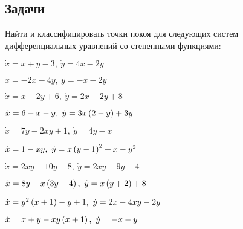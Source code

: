 \subsection{Задачи}

	Найти и классифицировать точки покоя для следующих систем дифференциальных уравнений со степенными функциями:
	\begin{multicols}{2}
		\begin{enumtasks}
			
			\label{stability_points:types_poly1}
			\item \( \dot{x} = x + y - 3, ~ \dot{y} = 4 x - 2 y \) %
			\item \( \dot{x} = - 2x - 4y, ~ \dot{y} = - x - 2y \) %
			\item \( \dot{x} = x - 2y + 6, ~ \dot{y} = 2x - 2y + 8 \) %
			\item \( \dot{x} = 6 - x - y, ~ \dot{y} = 3x \left( 2 - y \right) + 3 y \) %
			\item \( \dot{x} = 7y - 2xy + 1, ~ \dot{y} = 4y - x \) %
			\item \( \dot{x} = 1 - xy, ~ \dot{y} = x \left( y - 1 \right)^2 + x - y^2 \) %
			\item \( \dot{x} = 2xy - 10y - 8, ~ \dot{y} = 2xy - 9y - 4 \) %
			\item \( \dot{x} = 8y - x \left( 3y - 4 \right), ~ \dot{y} = x \left( y + 2 \right) + 8 \) %
			\item \( \dot{x} = y^2 \left( x + 1 \right) - y + 1, ~ \dot{y} = 2x - 4xy - 2 y \) %
			\item \( \dot{x} = x + y - xy \left( x + 1 \right), ~ \dot{y} = - x - y \) %

		\end{enumtasks}
	\end{multicols}

